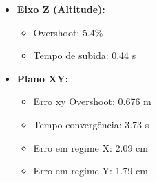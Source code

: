 \begin{itemize}
  \item \textbf{Eixo Z (Altitude):}
  \begin{itemize}
    \item Overshoot: 5.4\%
    \item Tempo de subida: 0.44 s
  \end{itemize}
  \item \textbf{Plano XY:}
  \begin{itemize}
    \item Erro xy Overshoot: 0.676 m
    \item Tempo convergência: 3.73 s
    \item Erro em regime X: 2.09 cm
    \item Erro em regime Y: 1.79 cm
  \end{itemize}
\end{itemize}
